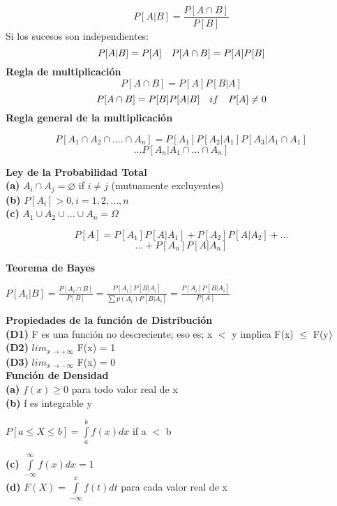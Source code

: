 \begin{minipage}{0.22\textwidth}
	\[P[A|B] = \frac{P[A \cap B]}{P[B]}\]
	Si los sucesos son independientes:
	\[P[A|B] = {P[A]} \hskip 1em {P[A \cap B]}=P[A]P[B]\]
	{\bf Regla de multiplicación}
	\[P[A \cap B] = P[A]P[B|A]\]
	\[P[A \cap B] = P[B]P[A|B] \hskip 1em if \hskip 1em P[A] \ne 0\]
	{\bf Regla general de la multiplicación}
	\begin{small}\[P[A_1 \cap A_2 \cap .... \cap A_n] = P[A_1]P[A_2|A_1]P[A_3|A_1 \cap A_1]\]
		\[... P[A_n|A_1\cap ... \cap A_n]\]\end{small}
	{\bf Ley de la Probabilidad Total} \\
	{\bf (a)} $A_i \cap A_j = \varnothing $ if $i \ne j$ (mutuamente excluyentes) \\
	{\bf (b)} $P[A_i]>0, i = 1,2,...,n$ \\
	{\bf (c)} $A_1 \cup A_2 \cup ... \cup A_n = \Omega $ \\
	\begin{small}\[P[A]= P[A_1]P[A|A_1] + P[A_2]P[A|A_2] + ...\]
		\[... + P[A_n]P[A|A_n]\]\end{small}
	{\bf Teorema de Bayes}
	\begin{center}$P[A_i|B] = \frac{P[A_i \cap B]}{P[B]} = \frac{P[A_i]P[B|A_i]}{\sum{p(A_i)}P[B|A_i]} = \frac{P[A_i]P[B|A_i]}{P[A]}$\end{center}
\end{minipage}
\vfill\null
\columnbreak
\begin{minipage}{0.22\textwidth}
	{\bf Propiedades de la función de Distribución} \\
	{\bf (D1)} F es una función no descreciente; eso es; x $<$ y implica F(x) $\le$ F(y) \\
	{\bf (D2)} $lim_{x \to + \infty}$ F(x) = 1 \\
	{\bf (D3)} $lim_{x \to - \infty}$ F(x) = 0 \\
	{\bf Función de Densidad} \\
	{\bf (a)} $f(x) \ge 0$ para todo valor real de x \\
	{\bf (b)} f es integrable y
	\begin{center} $P[a \le X \le b] = \int\limits_{a}^{b} f(x)dx$ if a $<$ b \end{center}
	{\bf (c)} $\int\limits_{-\infty}^{\infty} f(x)dx = 1$ \\
	{\bf (d)} $F(X) = \int\limits_{-\infty}^{x} f(t)dt$ para cada valor real de x \\
\end{minipage}
